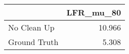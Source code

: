\begin{tabular}{lr}
\toprule
{} & LFR_mu_80 \\
\midrule
No Clean Up  &    10.966 \\
Ground Truth &     5.308 \\
\bottomrule
\end{tabular}
